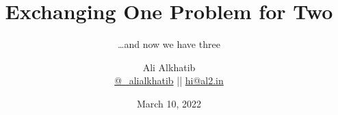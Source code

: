 \documentclass[aspectratio=169,12pt]{beamer} %
\title{Exchanging One Problem for Two}
\subtitle{\dots and now we have three}
\author[Ali Alkhatib]{{Ali Alkhatib}\\
\href{http://twitter.com/_alialkhatib}{@\_alialkhatib} || \href{mailto:hi@al2.in}{hi@al2.in}}
\date{March 10, 2022}
\newcommand{\onlyinsubfile}[1]{#1}
\newcommand{\notinsubfile}[1]{}
\begin{document}
\renewcommand{\onlyinsubfile}[1]{}
\renewcommand{\notinsubfile}[1]{#1}

\begin{frame}
\titlepage
\end{frame}






% 
% 






% 
% 
% 
% 
% 
% 
% 

% 
% 





% 


% 


% 



% 



\end{document}
